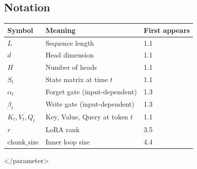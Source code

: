 \subsection{Notation}

\begin{table}[H]
\centering
\small
\begin{tabular}{lll}
\toprule
\textbf{Symbol} & \textbf{Meaning} & \textbf{First appears} \\
\midrule
$L$ & Sequence length & 1.1 \\
$d$ & Head dimension & 1.1 \\
$H$ & Number of heads & 1.1 \\
$S_t$ & State matrix at time $t$ & 1.1 \\
$\alpha_t$ & Forget gate (input-dependent) & 1.3 \\
$\beta_t$ & Write gate (input-dependent) & 1.3 \\
$K_t, V_t, Q_t$ & Key, Value, Query at token $t$ & 1.1 \\
$r$ & LoRA rank & 3.5 \\
$\text{chunk\_size}$ & Inner loop size & 4.4 \\
\bottomrule
\end{tabular}
\end{table}
\textless{}/parameter\textgreater{}

